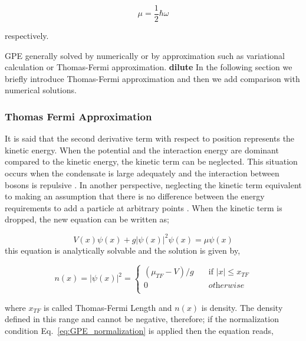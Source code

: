 \documentclass[a4paper,times,hidelinks,12pt]{article}
\begin{document}
\begin{equation}
\label{eq:GPE_1D_solution_harmonic}
    \mu = \frac{1}{2}\hbar\omega
\end{equation}

respectively. 

GPE generally solved by numerically or by approximation such as variational calculation or Thomas-Fermi approximation. \textbf{dilute} In the following section we briefly introduce Thomas-Fermi approximation and then we add comparison with numerical solutions. 

\subsubsection{Thomas Fermi Approximation}



It is said that the second derivative term with respect to position represents the kinetic energy. When the potential and the interaction energy are dominant compared to the kinetic energy, the kinetic term can be neglected. This situation occurs when the condensate is large adequately and the interaction between bosons is repulsive \cite{pethick2002bose}. In another perspective, neglecting the kinetic term equivalent to making an assumption that there is no difference between the energy requirements to add a particle at arbitrary points \cite{rogel2013gross}. When the kinetic term is dropped, the new equation can be written as;

\begin{equation}
\label{eq:GPE_1D_thomas_fermi}
    V(x)\psi(x) + g|\psi(x)|^2\psi(x) = \mu\psi(x)
\end{equation}
this equation is analytically solvable and the solution is given by,


\begin{equation}
\label{eq:thomas_fermi_solution}    
n(x) = |\psi(x)|^2 =  
    \begin{cases}
        (\mu_{TF} - V)/g &\quad\text{if }  |x| \le x_{TF}  \\
        0 &\quad \textit{otherwise} \\
    \end{cases}
\end{equation}

where $x_{TF}$ is called Thomas-Fermi Length and $n(x)$ is density. The density defined in this range and cannot be negative, therefore; if the normalization condition Eq.~\eqref{eq:GPE_normalization} is applied then the equation reads,  
\end{document}
